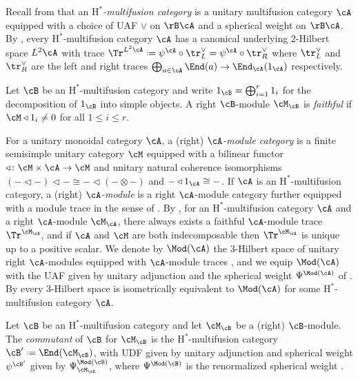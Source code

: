 \documentclass[12pt,reqno]{amsart}
\newcommand{\Hstar}{\ensuremath{\mathrm{H}^{*}}}
\newcommand{\defn}[1]{\emph{#1}}
\DeclareRobustCommand{\coloneq}{\mathrel{\vcenter{\baselineskip0.5ex\lineskiplimit0pt\hbox{\scriptsize{\upshape.}}\hbox{\scriptsize{\upshape.}}}}=}
\begin{document}
Recall from \cite[Defn. 3.1]{3Hilb} that an \defn{$\Hstar$-multifusion category} is a unitary multifusion category $\cA$ equipped with a choice of UAF $\vee$ on $\rB\cA$ and a spherical weight on $\rB\cA$. By \cite[Rmk. 3.2]{3Hilb}, every $\Hstar$-multifusion category $\cA$ has a canonical underlying 2-Hilbert space $L^2\cA$ with trace $\Tr^{L^2\cA} \coloneq \psi^\cA\circ\tr^\vee_L=\psi^\cA\circ\tr^\vee_R$ where $\tr_L^\vee$ and $\tr^\vee_R$ are the left and right traces $\bigoplus_{a\in \cA}\End(a)\to\End_\cA(1_\cA)$ respectively.

Let $\cB$ be an $\Hstar$-multifusion category and write $1_\cB = \bigoplus_{i=1}^r 1_i$ for the decomposition of $1_\cB$ into simple objects. A right $\cB$-module $\cM_\cB$ is \defn{faithful} if $\cM \triangleleft 1_i \neq 0$ for all $1 \le i \le r$. 

For a unitary monoidal category $\cA$, a (right) \defn{$\cA$-module category} is a finite semisimple unitary category $\cM$ equipped with a bilinear functor $\triangleleft\colon \cM\times\cA\to\cM$ and unitary natural coherence isomorphisms $(-\triangleleft -)\triangleleft - \cong -\triangleleft(-\otimes -)$ and $-\triangleleft 1_\cA \cong -$. If $\cA$ is an $\Hstar$-multifusion category, a (right) \defn{$\cA$-module} is a right $\cA$-module category further equipped with a module trace in the sense of \cite[Defn. 3.4]{3Hilb}.
By \cite[Cor. 3.13]{3Hilb}, for an $\Hstar$-multifusion category $\cA$ and a right $\cA$-module $\cM_\cA$, there always exists a faithful $\cA$-module trace $\Tr^{\cM_\cA}$, and if $\cA$ and $\cM$ are both indecomposable then $\Tr^{\cM_\cA}$ is unique up to a positive scalar. We denote by $\Mod(\cA)$ the 3-Hilbert space of unitary right $\cA$-modules equipped with $\cA$-module traces \cite[Defn. 3.6]{3Hilb}, and we equip $\Mod(\cA)$ with the UAF given by unitary adjunction and the spherical weight $\Psi^{\Mod(\cA)}$ of \cite[Eqn. (7)]{bases}. By \cite[Cor. 4.52]{3Hilb} every 3-Hilbert space is isometrically equivalent to $\Mod(\cA)$ for some $\Hstar$-multifusion category $\cA$.

\begin{definition}[Commutant of an $\Hstar$-multifusion category]
\label{def:commutant}
Let $\cB$ be an $\Hstar$-multifusion category and let $\cM_\cB$ be a (right) $\cB$-module. The \defn{commutant} of $\cB$ for $\cM_\cB$ is the $\Hstar$-multifusion category $\cB' \coloneq \End(\cM_\cB)$, with UDF given by unitary adjunction and spherical weight $\psi^{\cB'}$ given by $\Psi^{\Mod(\cB)}_{\cM_\cB}$, where $\Psi^{\Mod(\cB)}$ is the renormalized spherical weight \cite[(7)]{bases}.
\end{definition}
\end{document}
